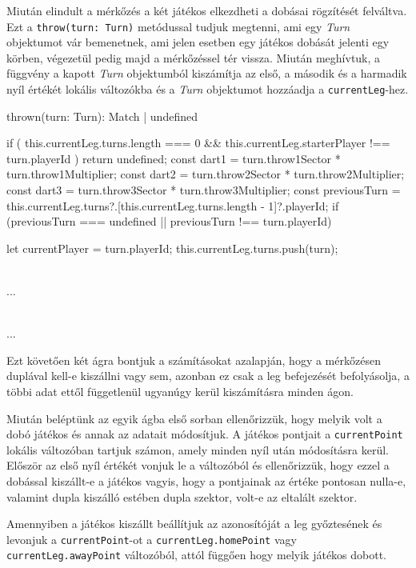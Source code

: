 Miután elindult a mérkőzés a két játékos elkezdheti a dobásai rögzítését felváltva. Ezt a \texttt{throw(turn: Turn)} metódussal tudjuk megtenni, ami egy \textit{Turn} objektumot vár bemenetnek, ami jelen esetben egy játékos dobását jelenti egy körben, végezetül pedig majd a mérkőzéssel tér vissza. Miután meghívtuk, a függvény a kapott \textit{Turn} objektumból kiszámítja az első, a második és a harmadik nyíl értékét lokális változókba és a \textit{Turn} objektumot hozzáadja a \texttt{currentLeg}-hez.

\begin{cpp}
thrown(turn: Turn): Match | undefined {
 if (
  this.currentLeg.turns.length === 0 && 
  this.currentLeg.starterPlayer !== turn.playerId
 ) {
  return undefined;
 }
 const dart1 = turn.throw1Sector * turn.throw1Multiplier;
 const dart2 = turn.throw2Sector * turn.throw2Multiplier;
 const dart3 = turn.throw3Sector * turn.throw3Multiplier;
 const previousTurn = 
  this.currentLeg.turns?.[this.currentLeg.turns.length - 1]?.playerId;
 if (previousTurn === undefined || previousTurn !== turn.playerId) {
  let currentPlayer = turn.playerId;
  this.currentLeg.turns.push(turn);
  
  \\...
  
 }
 
 \\...
 
}
\end{cpp}

Ezt követően két ágra bontjuk a számításokat azalapján, hogy a mérkőzésen duplával kell-e kiszállni vagy sem, azonban ez csak a leg befejezését befolyásolja, a többi adat ettől függetlenül ugyanúgy kerül kiszámításra minden ágon.

Miután beléptünk az egyik ágba első sorban ellenőrizzük, hogy melyik volt a dobó játékos és annak az adatait módosítjuk. A játékos pontjait a \texttt{currentPoint} lokális változóban tartjuk számon, amely minden nyíl után módosításra kerül. Először az első nyíl értékét vonjuk le a változóból és ellenőrizzük, hogy ezzel a dobással kiszállt-e a játékos vagyis, hogy a pontjainak az értéke pontosan nulla-e, valamint dupla kiszálló estében dupla szektor, volt-e az eltalált szektor. 

Amennyiben a játékos kiszállt beállítjuk az azonosítóját a leg győztesének és levonjuk a \texttt{currentPoint}-ot a \texttt{currentLeg.homePoint} vagy \texttt{currentLeg.awayPoint} változóból, attól függően hogy melyik játékos dobott. 

